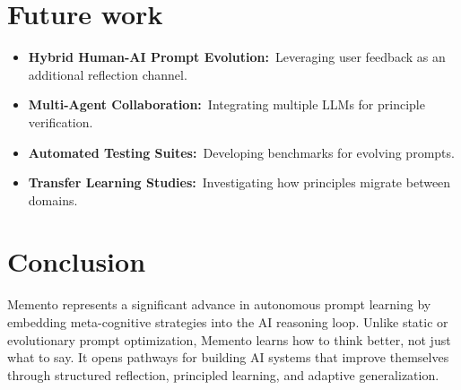 \documentclass[10pt,a4paper,twocolumn]{article}
\begin{document}
\section{{Future work} }







\begin{itemize}
    \item \textbf{Hybrid Human-AI Prompt Evolution:} Leveraging user feedback as an additional reflection channel.
    \item \textbf{Multi-Agent Collaboration:} Integrating multiple LLMs for principle verification.
    \item \textbf{Automated Testing Suites:} Developing benchmarks for evolving prompts.
    \item \textbf{Transfer Learning Studies:} Investigating how principles migrate between domains.
\end{itemize}




\section{{Conclusion} }




 Memento represents a significant advance in autonomous prompt learning by embedding meta-cognitive strategies into the AI reasoning loop. Unlike static or evolutionary prompt optimization, Memento learns how to think better, not just what to say. It opens pathways for building AI systems that improve themselves through structured reflection, principled learning, and adaptive generalization.












\end{document}
